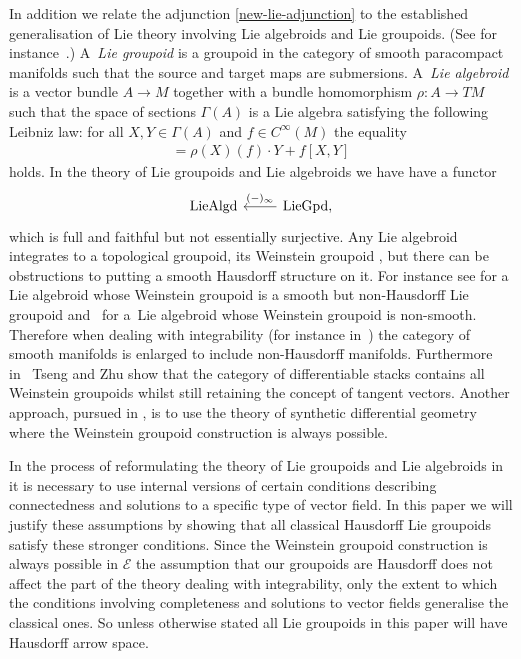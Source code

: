 \documentclass[10pt,a4paper]{amsart}
\numberwithin{equation}{section}
\begin{document}
In addition we relate the adjunction \eqref{new-lie-adjunction} to the established generalisation of Lie theory involving Lie algebroids and Lie groupoids. (See for instance~\cite{MR2157566}.) A~\emph{Lie groupoid} is a groupoid in the category of smooth paracompact manifolds such that the source and target maps are submersions. A~\emph{Lie algebroid} is a vector bundle $A \rightarrow M$ together with a bundle homomorphism $\rho\colon A \rightarrow TM$ such that the space of sections $\Gamma(A)$ is a Lie algebra satisfying the following Leibniz law: for all $X,Y\in \Gamma(A)$ and $f\in C^{\infty}(M)$ the equality
\begin{gather*}[X,fY]=\rho(X)(f)\cdot Y+f[X,Y]\end{gather*}
holds.
In the theory of Lie groupoids and Lie algebroids we have have a functor
\begin{equation*}
\begin{tikzcd}
 {\rm LieAlgd} & {\rm LieGpd}, \lar[swap]{(-)_{\infty}}
\end{tikzcd}
\end{equation*}
which is full and faithful but not essentially surjective. Any Lie algebroid integrates to a topological groupoid, its Weinstein groupoid \cite{MR1973056}, but there can be obstructions to putting a smooth Hausdorf\/f structure on it. For instance see \cite{MR0197622} for a Lie algebroid whose Weinstein groupoid is a smooth but non-Hausdorf\/f Lie groupoid and~\cite{MR778785} for a~Lie algebroid whose Weinstein groupoid is non-smooth. Therefore when dealing with integrability (for instance in~\cite{MR1973056}) the category of smooth manifolds is enlarged to include non-Hausdorf\/f manifolds. Furthermore in~\cite{2006HsianHuaTsengandChenchangZhu22} Tseng and Zhu show that the category of dif\/ferentiable stacks contains all Weinstein groupoids whilst still retaining the concept of tangent vectors. Another approach, pursued in \cite{burke-relative-to-local-models}, is to use the theory of synthetic dif\/ferential geometry where the Weinstein groupoid construction is always possible.

In the process of reformulating the theory of Lie groupoids and Lie algebroids in~\cite{burke-relative-to-local-models} it is necessary to use internal versions of certain conditions describing connectedness and solutions to a specif\/ic type of vector f\/ield. In this paper we will justify these assumptions by showing that all classical Hausdorf\/f Lie groupoids satisfy these stronger conditions. Since the Weinstein groupoid construction is always possible in $\mathcal{E}$ the assumption that our groupoids are Hausdorf\/f does not af\/fect the part of the theory dealing with integrability, only the extent to which the conditions involving completeness and solutions to vector f\/ields generalise the classical ones. So unless otherwise stated all Lie groupoids in this paper will have Hausdorf\/f arrow space.
\end{document}
